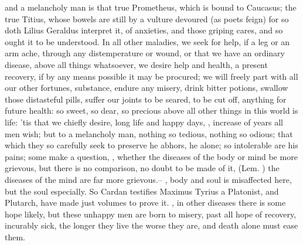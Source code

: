 and a melancholy man is that true Prometheus, which is bound to Caucasus; the
true Titius, whose bowels are still by a vulture devoured (as poets feign) for
so doth Lilius Geraldus interpret it, of anxieties, and
those griping cares, and so ought it to be understood. In all other maladies,
we seek for help, if a leg or an arm ache, through any distemperature or wound,
or that we have an ordinary disease, above all things whatsoever, we desire
help and health, a present recovery, if by any means possible it may be
procured; we will freely part with all our other fortunes, substance, endure
any misery, drink bitter potions, swallow those distasteful pills, suffer our
joints to be seared, to be cut off, anything for future health: so sweet, so
dear, so precious above all other things in this world is life: 'tis that we
chiefly desire, long life and happy days, , increase of years all men wish; but to a melancholy man,
nothing so tedious, nothing so odious; that which they so carefully seek to
preserve he abhors, he alone; so intolerable are his
pains; some make a question, , whether
the diseases of the body or mind be more grievous, but there is no comparison,
no doubt to be made of it,  (Lem. ) the
diseases of the mind are far more grievous.-- , body and soul is misaffected here, but the soul especially. So Cardan
testifies 
Maximus Tyrius a Platonist, and Plutarch, have made just
volumes to prove it. , in other diseases there is some hope likely, but these unhappy men
are born to misery, past all hope of recovery, incurably sick, the longer they
live the worse they are, and death alone must ease them.

